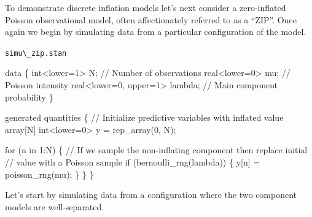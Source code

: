 \documentclass[
  letterpaper,
  DIV=11,
  numbers=noendperiod]{scrartcl}
\newenvironment{Shaded}{\begin{snugshade}}{\end{snugshade}}
\newcommand{\CommentTok}[1]{\textcolor[rgb]{0.37,0.37,0.37}{#1}}
\newcommand{\ControlFlowTok}[1]{\textcolor[rgb]{0.00,0.23,0.31}{#1}}
\newcommand{\DataTypeTok}[1]{\textcolor[rgb]{0.68,0.00,0.00}{#1}}
\newcommand{\DecValTok}[1]{\textcolor[rgb]{0.68,0.00,0.00}{#1}}
\newcommand{\KeywordTok}[1]{\textcolor[rgb]{0.00,0.23,0.31}{#1}}
\newcommand{\NormalTok}[1]{\textcolor[rgb]{0.00,0.23,0.31}{#1}}
\begin{document}
To demonstrate discrete inflation models let's next consider a
zero-inflated Poisson observational model, often affectionately referred
to as a ``ZIP''. Once again we begin by simulating data from a
particular configuration of the model.

\begin{codelisting}

\caption{\texttt{simu\textbackslash\_zip.stan}}

\begin{Shaded}
\begin{Highlighting}[]
\KeywordTok{data}\NormalTok{ \{}
  \DataTypeTok{int}\NormalTok{\textless{}}\KeywordTok{lower}\NormalTok{=}\DecValTok{1}\NormalTok{\textgreater{} N;   }\CommentTok{// Number of observations}
  \DataTypeTok{real}\NormalTok{\textless{}}\KeywordTok{lower}\NormalTok{=}\DecValTok{0}\NormalTok{\textgreater{} mu; }\CommentTok{// Poisson intensity}
  \DataTypeTok{real}\NormalTok{\textless{}}\KeywordTok{lower}\NormalTok{=}\DecValTok{0}\NormalTok{, }\KeywordTok{upper}\NormalTok{=}\DecValTok{1}\NormalTok{\textgreater{} lambda; }\CommentTok{// Main component probability}
\NormalTok{\}}

\KeywordTok{generated quantities}\NormalTok{ \{}
  \CommentTok{// Initialize predictive variables with inflated value}
  \DataTypeTok{array}\NormalTok{[N] }\DataTypeTok{int}\NormalTok{\textless{}}\KeywordTok{lower}\NormalTok{=}\DecValTok{0}\NormalTok{\textgreater{} y = rep\_array(}\DecValTok{0}\NormalTok{, N);}

  \ControlFlowTok{for}\NormalTok{ (n }\ControlFlowTok{in} \DecValTok{1}\NormalTok{:N) \{}
    \CommentTok{// If we sample the non{-}inflating component then replace initial}
    \CommentTok{// value with a Poisson sample}
    \ControlFlowTok{if}\NormalTok{ (bernoulli\_rng(lambda)) \{}
\NormalTok{      y[n] = poisson\_rng(mu);}
\NormalTok{    \}}
\NormalTok{  \}}
\NormalTok{\}}
\end{Highlighting}
\end{Shaded}

\end{codelisting}

Let's start by simulating data from a configuration where the two
component models are well-separated.
\end{document}
